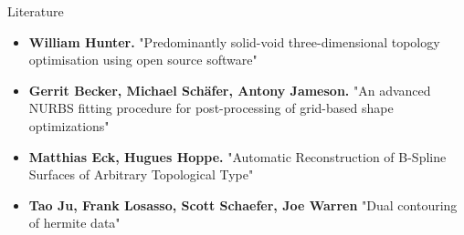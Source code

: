 \begin{frame}{Literature}
\begin{itemize}
\item \textbf{William Hunter.} "Predominantly solid-void three-dimensional topology optimisation using open source software"
\item \textbf{Gerrit Becker, Michael Sch\"afer, Antony Jameson.} "An advanced NURBS fitting procedure for post-processing of grid-based shape optimizations"
\item \textbf{Matthias Eck, Hugues Hoppe.} "Automatic Reconstruction of B-Spline Surfaces of Arbitrary Topological Type"
\item \textbf{Tao Ju, Frank Losasso, Scott Schaefer, Joe Warren} "Dual contouring of hermite data"
\end{itemize}
\end{frame}
